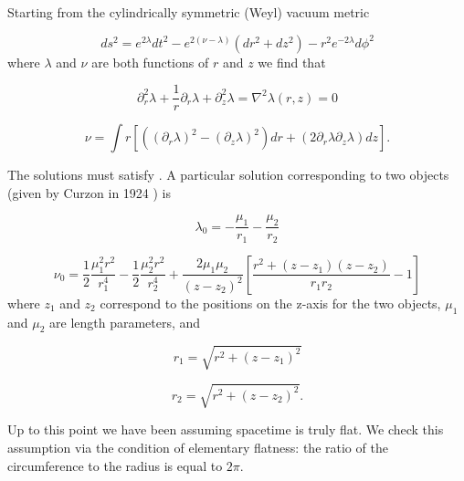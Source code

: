 \documentclass[12pt]{article}
\begin{document}
Starting from the cylindrically symmetric (Weyl) vacuum metric \cite{synge_relativity}

\begin{equation}
	ds^{2}=e^{2\lambda}dt^{2}-e^{2\left(\nu-\lambda\right)}\left(dr^{2}+dz^{2}\right)-r^{2}e^{-2\lambda}d\phi^{2}
	\label{eq:weyl-vacuum-metric}
\end{equation}
where $\lambda$ and $\nu$ are both functions of $r$ and $z$ we find that

\begin{equation}
\partial^{2}_{r}\lambda+\frac{1}{r}\partial_{r}\lambda+\partial^{2}_{z}\lambda=\nabla^2\lambda(r,z)=0
\label{eq:laplace-r-z}
\end{equation}

\begin{equation}
\nu=\int r[\left(\left(\partial_{r}\lambda\right)^{2}-\left(\partial_{z}\lambda\right)^{2}\right)dr+\left(2\partial_{r}\lambda\partial_{z}\lambda\right)dz].
\label{eq:nu}
\end{equation}

The solutions must satisfy . A particular solution corresponding to two objects (given by Curzon in 1924 \cite{curzon1924} ) is

\begin{equation}
\lambda_0=-\frac{\mu_1}{r_1}-\frac{\mu_2}{r_2}
\label{eq:lambda-0}
\end{equation}

\begin{equation}
	\label{eq:nu-0}
	\nu_0=\frac{1}{2}\frac{\mu_{1}^{2}r^2}{r_{1}^{4}}-\frac{1}{2}\frac{\mu_{2}^{2}r^2}{r_{2}^{4}}+\frac{2\mu_1\mu_2}{(z-z_2)^2}\left[\frac{r^2+(z-z_1)(z-z_2)}{r_{1}r_{2}}-1\right]
\end{equation}
where $z_1$ and $z_2$ correspond to the positions on the z-axis for the two objects, $\mu_1$ and $\mu_2$ are length parameters, and

\begin{equation}
r_1=\sqrt{r^2+(z-z_1)^2}
\label{eq:r_1}
\end{equation}

\begin{equation}
r_2=\sqrt{r^2+(z-z_2)^2}.
\label{eq:r_2}
\end{equation}

Up to this point we have been assuming spacetime is truly flat. We check this assumption via the condition of elementary flatness: the ratio of the circumference to the radius is equal to $2\pi$. 
\end{document}
